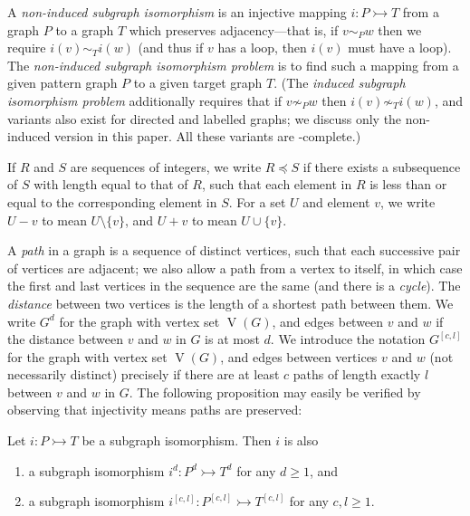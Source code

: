 \documentclass{llncs}
\begin{document}
A \emph{non-induced subgraph isomorphism} is an injective mapping $i : P \rightarrowtail T$ from a
graph $P$ to a graph $T$ which preserves adjacency---that is, if $v \sim_{P} w$ then we require
$i(v) \sim_{T} i(w)$ (and thus if $v$ has a loop, then $i(v)$ must have a loop). The
\emph{non-induced subgraph isomorphism problem} is to find such a mapping from a given pattern graph
$P$ to a given target graph $T$.  (The \emph{induced subgraph isomorphism problem} additionally
requires that if $v \not\sim_{P} w$ then $i(v) \not\sim_{T} i(w)$, and variants also exist for
directed and labelled graphs; we discuss only the non-induced version in this paper. All these
variants are \NP-complete.)

If $R$ and $S$ are sequences of integers, we write $R \preceq S$ if there exists a subsequence of
$S$ with length equal to that of $R$, such that each element in $R$ is less than or equal to the
corresponding element in $S$.  For a set $U$ and element $v$, we write $U - v$ to mean $U \setminus
\{ v \}$, and $U + v$ to mean $U \cup \{ v \}$.

A \emph{path} in a graph is a sequence of distinct vertices, such that each successive pair of
vertices are adjacent; we also allow a path from a vertex to itself, in which case the first and
last vertices in the sequence are the same (and there is a \emph{cycle}). The \emph{distance}
between two vertices is the length of a shortest path between them. We write $G^d$ for the graph
with vertex set $\operatorname{V}(G)$, and edges between $v$ and $w$ if the distance between $v$ and
$w$ in $G$ is at most $d$.  We introduce the notation $G^{\left[c, l\right]}$ for the graph with
vertex set $\operatorname{V}(G)$, and edges between vertices $v$ and $w$ (not necessarily distinct)
precisely if there are at least $c$ paths of length exactly $l$ between $v$ and $w$ in $G$. The
following proposition may easily be verified by observing that injectivity means paths are
preserved:

\begin{proposition}\label{proposition:supplemental}
    Let $i : P \rightarrowtail T$ be a subgraph isomorphism. Then $i$ is also
    \begin{enumerate}[itemindent=1em,topsep=2pt,itemsep=0.2pt]
        \item a subgraph isomorphism $i^d : P^d \rightarrowtail T^d$ for any $d \ge 1$, and
        \item a subgraph isomorphism $i^{\left[c, l\right]} : P^{\left[c, l\right]} \rightarrowtail
            T^{\left[c, l\right]}$ for any $c, l \ge 1$.
    \end{enumerate}
\end{proposition}
\end{document}
